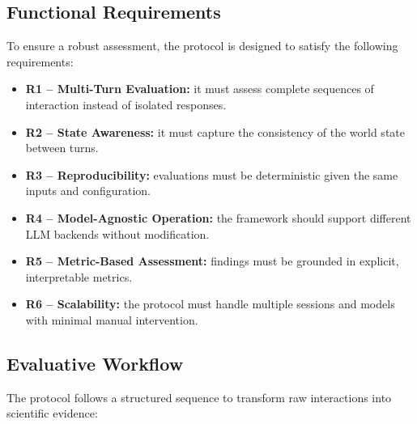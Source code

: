 \documentclass[12pt]{article}
\begin{document}
\subsection{Functional Requirements}
\label{sec:requirements}

To ensure a robust assessment, the protocol is designed to satisfy the following requirements:

\begin{itemize}[leftmargin=2.4em,itemsep=2pt]
  \item \textbf{R1 -- Multi-Turn Evaluation:} it must assess complete sequences of interaction instead of isolated responses.
  \item \textbf{R2 -- State Awareness:} it must capture the consistency of the world state between turns.
  \item \textbf{R3 -- Reproducibility:} evaluations must be deterministic given the same inputs and configuration.
  \item \textbf{R4 -- Model-Agnostic Operation:} the framework should support different LLM backends without modification.
  \item \textbf{R5 -- Metric-Based Assessment:} findings must be grounded in explicit, interpretable metrics.
  \item \textbf{R6 -- Scalability:} the protocol must handle multiple sessions and models with minimal manual intervention.
\end{itemize}

\subsection{Evaluative Workflow}

The protocol follows a structured sequence to transform raw interactions into scientific evidence:
\end{document}
